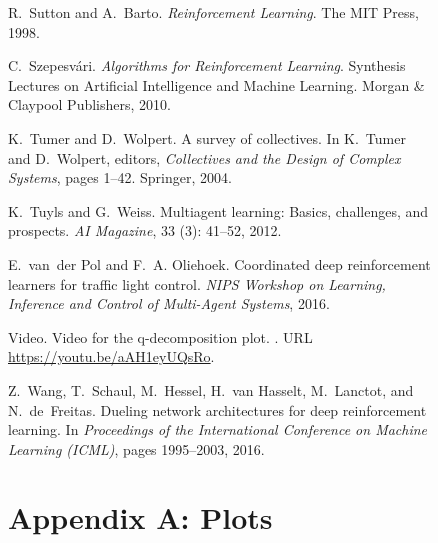 \documentclass{article}
\begin{document}
\begin{SCfigure}
\begin{thebibliography}{40}
R.~Sutton and A.~Barto.
\newblock \emph{Reinforcement Learning}.
\newblock The MIT Press, 1998.

C.~Szepesv{\'{a}}ri.
\newblock \emph{Algorithms for Reinforcement Learning}.
\newblock Synthesis Lectures on Artificial Intelligence and Machine Learning.
  Morgan {\&} Claypool Publishers, 2010.

K.~Tumer and D.~Wolpert.
\newblock A survey of collectives.
\newblock In K.~Tumer and D.~Wolpert, editors, \emph{Collectives and the Design
  of Complex Systems}, pages 1--42. Springer, 2004.

K.~Tuyls and G.~Weiss.
\newblock Multiagent learning: Basics, challenges, and prospects.
\newblock \emph{{AI} Magazine}, 33 (3): 41--52, 2012.

E.~van~der Pol and F.~A. Oliehoek.
\newblock Coordinated deep reinforcement learners for traffic light control.
\newblock \emph{NIPS Workshop on Learning, Inference and Control of Multi-Agent
  Systems}, 2016.

{Video}.
\newblock Video for the q-decomposition plot.
.
\newblock URL \url{https://youtu.be/aAH1eyUQsRo}.

Z.~Wang, T.~Schaul, M.~Hessel, H.~van Hasselt, M.~Lanctot, and N.~de~Freitas.
\newblock Dueling network architectures for deep reinforcement learning.
\newblock In \emph{Proceedings of the International Conference on Machine
  Learning (ICML)}, pages 1995--2003, 2016.

\end{thebibliography}

\newpage


\section*{Appendix A: Plots}



\end{SCfigure}
\end{document}

